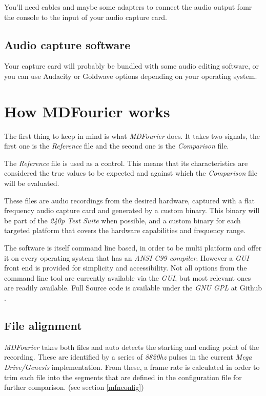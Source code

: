 \documentclass[10pt,a4paper]{report}
\begin{document}
You'll need cables and maybe some adapters to connect the audio output fomr the console to the input of your audio capture card.

\section{Audio capture software}

Your capture card will probably be bundled with some audio editing software, or you can use  Audacity\cite{audacity} or Goldwave\cite{goldwave} options depending on your operating system.

\chapter{How MDFourier works}
\label{howitworks}

The first thing to keep in mind is what \textit{MDFourier} does. It takes two signals, the first one is the \textit{Reference} file and the second one is the \textit{Comparison} file.

The \textit{Reference} file is used as a control. This means that its characteristics are considered the true values to be expected and against which the \textit{Comparison} file will be evaluated.

These files are audio recordings from the desired hardware, captured with a flat frequency audio capture card and generated by a custom binary. This binary will be part of the \textit{240p Test Suite}\cite{240pSuite} when possible, and a custom binary for each targeted platform that covers the hardware capabilities and frequency range.

The software is itself command line based, in order to be multi platform and offer it on every operating system that has an \textit{ANSI C99 compiler}. However a \textit{GUI} front end is provided for simplicity and accessibility. Not all options from the command line tool are currently available via the \textit{GUI}, but most relevant ones are readily available. Full Source code is available under the \textit{GNU GPL} at Github \cite{sourcecode}.

\section{File alignment}

\textit{MDFourier} takes both files and auto detects the starting and ending point of the recording. These are identified by a series of \textit{8820hz} pulses in the current \textit{Mega Drive/Genesis} implementation. From these, a frame rate is calculated in order to trim each file into the segments that are defined in the configuration file for further comparison. (see section \ref{mfnconfig})
\end{document}
